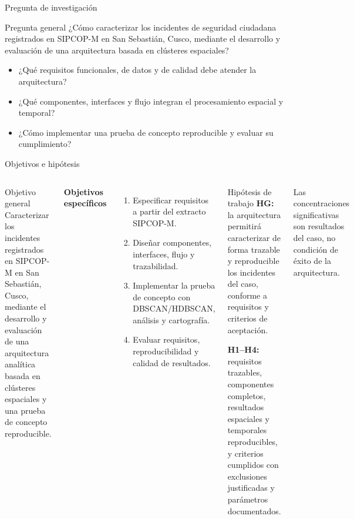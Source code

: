 \documentclass[aspectratio=169,10pt]{beamer}
\begin{document}
\begin{frame}{Pregunta de investigación}
  \vspace{.45cm}
  \begin{block}{Pregunta general}
    \centering\large
    ¿Cómo caracterizar los incidentes de seguridad ciudadana registrados en SIPCOP-M en San Sebastián, Cusco, mediante el desarrollo y evaluación de una arquitectura basada en clústeres espaciales?
  \end{block}
  \vspace{.3cm}
  \begin{itemize}
    \item ¿Qué requisitos funcionales, de datos y de calidad debe atender la arquitectura?
    \item ¿Qué componentes, interfaces y flujo integran el procesamiento espacial y temporal?
    \item ¿Cómo implementar una prueba de concepto reproducible y evaluar su cumplimiento?
  \end{itemize}
\end{frame}

\begin{frame}{Objetivos e hipótesis}
  \begin{columns}[T,onlytextwidth]
      \begin{block}{Objetivo general}
        Caracterizar los incidentes registrados en SIPCOP-M en San Sebastián, Cusco, mediante el desarrollo y evaluación de una arquitectura analítica basada en clústeres espaciales y una prueba de concepto reproducible.
      \end{block}
      \textbf{Objetivos específicos}
      \begin{enumerate}
        \item Especificar requisitos a partir del extracto SIPCOP-M.
        \item Diseñar componentes, interfaces, flujo y trazabilidad.
        \item Implementar la prueba de concepto con DBSCAN/HDBSCAN, análisis y cartografía.
        \item Evaluar requisitos, reproducibilidad y calidad de resultados.
      \end{enumerate}
      \begin{block}{Hipótesis de trabajo}
        \textbf{HG:} la arquitectura permitirá caracterizar de forma trazable y reproducible los incidentes del caso, conforme a requisitos y criterios de aceptación.

        \medskip
        \textbf{H1--H4:} requisitos trazables, componentes completos, resultados espaciales y temporales reproducibles, y criterios cumplidos con exclusiones justificadas y parámetros documentados.
      \end{block}
      \footnotesize Las concentraciones significativas son resultados del caso, no condición de éxito de la arquitectura.
  \end{columns}
\end{frame}
\end{document}
